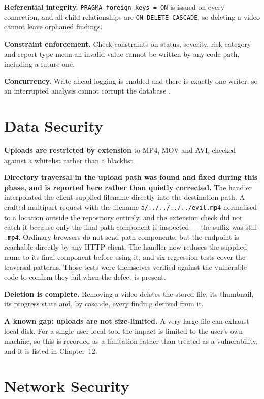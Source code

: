 \documentclass[
12pt,
a4paper,
oneside
]{report}
\begin{document}
\textbf{Referential integrity.} \texttt{PRAGMA foreign\_keys = ON} is issued on
every connection, and all child relationships are \texttt{ON DELETE CASCADE}, so
deleting a video cannot leave orphaned findings.

\textbf{Constraint enforcement.} Check constraints on status, severity, risk
category and report type mean an invalid value cannot be written by any code
path, including a future one.

\textbf{Concurrency.} Write-ahead logging is enabled and there is exactly one
writer, so an interrupted analysis cannot corrupt the database
\cite{SQLiteWAL}.

\section{Data Security}

\textbf{Uploads are restricted by extension} to MP4, MOV and AVI, checked
against a whitelist rather than a blacklist.

\textbf{Directory traversal in the upload path was found and fixed during this
phase, and is reported here rather than quietly corrected.} The handler
interpolated the client-supplied filename directly into the destination path. A
crafted multipart request with the filename
\texttt{a/../../../../evil.mp4} normalised to a location outside the repository
entirely, and the extension check did not catch it because only the final path
component is inspected --- the suffix was still \texttt{.mp4}. Ordinary browsers
do not send path components, but the endpoint is reachable directly by any HTTP
client. The handler now reduces the supplied name to its final component before
using it, and six regression tests cover the traversal patterns. Those tests were
themselves verified against the vulnerable code to confirm they fail when the
defect is present.

\textbf{Deletion is complete.} Removing a video deletes the stored file, its
thumbnail, its progress state and, by cascade, every finding derived from it.

\textbf{A known gap: uploads are not size-limited.} A very large file can
exhaust local disk. For a single-user local tool the impact is limited to the
user's own machine, so this is recorded as a limitation rather than treated as a
vulnerability, and it is listed in Chapter~12.

\section{Network Security}
\label{sec:netsec}
\end{document}
